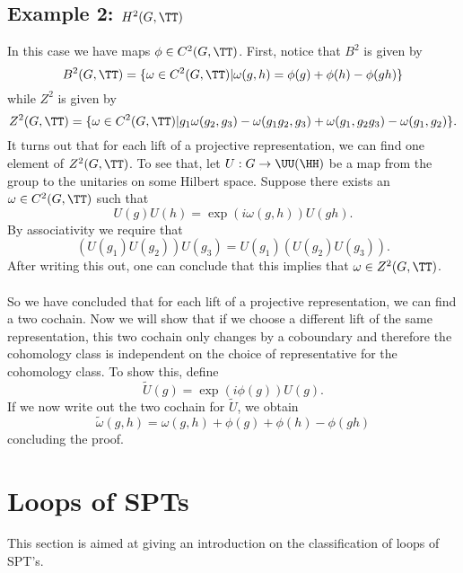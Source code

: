 \subsection{Example 2: $H^2(G,\TT)$}\label{sec:example-2-h2gtt}
In this case we have maps $\phi\in C^2(G,\TT)$. First, notice that $B^2$ is given by
\begin{equation}
	B^2(G,\TT)=\{\omega\in C^2(G,\TT)|\omega(g,h)=\phi(g)+\phi(h)-\phi(gh)\}
\end{equation}
while $Z^2$ is given by
\begin{equation}
	Z^2(G,\TT)=\{\omega\in C^2(G,\TT)|g_1\omega(g_2,g_3)-\omega(g_1g_2,g_3)+\omega(g_1,g_2g_3)-\omega(g_1,g_2)\}. 
\end{equation}
It turns out that for each lift of a projective representation, we can find one element of $Z^2(G,\TT)$. To see that, let $U:G\rightarrow\UU(\HH)$ be a map from the group to the unitaries on some Hilbert space. Suppose there exists an $\omega\in C^2(G,\TT)$ such that
\begin{equation}
	U(g)U(h)=\exp(i\omega(g,h))U(gh).
\end{equation}
By associativity we require that
\begin{equation}
	(U(g_1)U(g_2))U(g_3)=U(g_1)(U(g_2)U(g_3)).
\end{equation}
After writing this out, one can conclude that this implies that $\omega\in Z^2(G,\TT)$.\\\\
So we have concluded that for each lift of a projective representation, we can find a two cochain. Now we will show that if we choose a different lift of the same representation, this two cochain only changes by a coboundary and therefore the cohomology class is independent on the choice of representative for the cohomology class. To show this, define
\begin{equation}
	\tilde{U}(g)=\exp(i \phi(g))U(g).
\end{equation}
If we now write out the two cochain for $\tilde{U}$, we obtain
\begin{equation}
	\tilde{\omega}(g,h)=\omega(g,h)+\phi(g)+\phi(h)-\phi(gh)
\end{equation}
concluding the proof.
\section{Loops of SPTs}
This section is aimed at giving an introduction on the classification of loops of SPT's.
